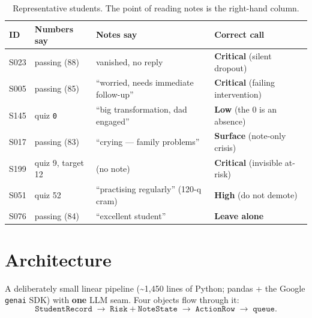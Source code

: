 \documentclass[11pt,paper=a4,parskip=half,DIV=11]{scrartcl}
\begin{document}
\begin{table}[h]\centering\footnotesize
\caption{Representative students. The point of reading notes is the right-hand column.}
\begin{tabular}{llp{4.4cm}l}
\toprule
ID & Numbers say & Notes say & Correct call \\
\midrule
S023 & passing (88) & vanished, no reply & \textbf{Critical} (silent dropout) \\
S005 & passing (85) & ``worried, needs immediate follow-up'' & \textbf{Critical} (failing intervention) \\
S145 & quiz \texttt{0} & ``big transformation, dad engaged'' & \textbf{Low} (the 0 is an absence) \\
S017 & passing (83) & ``crying --- family problems'' & \textbf{Surface} (note-only crisis) \\
S199 & quiz 9, target 12 & (no note) & \textbf{Critical} (invisible at-risk) \\
S051 & quiz 52 & ``practising regularly'' (120-q cram) & \textbf{High} (do not demote) \\
S076 & passing (84) & ``excellent student'' & \textbf{Leave alone} \\
\bottomrule
\end{tabular}
\end{table}

\section{Architecture}
A deliberately small linear pipeline (\textasciitilde1{,}450 lines of Python; pandas + the Google
\texttt{genai} SDK) with \textbf{one} LLM seam. Four objects flow through it:
\[
\texttt{StudentRecord}\;\rightarrow\;\texttt{Risk}+\texttt{NoteState}\;\rightarrow\;\texttt{ActionRow}\;\rightarrow\;\texttt{queue}.
\]
\end{document}
